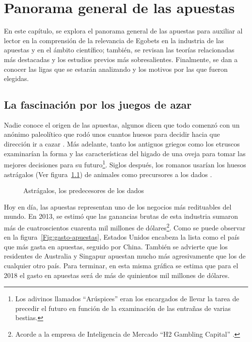 \graphicspath{{/Users/brunomedina/Dropbox/Tesis-Egobets/egobets-notas/resources/marco/}}
\chapter{Panorama general de las apuestas}


En este capítulo, se explora el panorama general de las apuestas para auxiliar al lector en la comprensión de la relevancia de Egobets en la industria de las apuestas y en el ámbito científico; también, se revisan las teorías relacionadas más destacadas y los estudios previos más sobresalientes. Finalmente, se dan a conocer las ligas que se estarán analizando y los motivos por las que fueron elegidas.

 \section{La fascinación por los juegos de azar}

Nadie conoce el origen de las apuestas, algunos dicen que todo comenzó con un anónimo paleolítico que rodó unos cuantos huesos para decidir hacia que dirección ir a cazar \cite{schwartz2013roll}. Más adelante, tanto los antiguos griegos como los etruscos examinarían la forma y las características del higado de una oveja para tomar las mejores decisiones para su futuro\footnote{Los adivinos llamados ``Arúspices'' eran los encargados de llevar la tarea de precedir el futuro en función de la examinación de las entrañas de varias bestias.}. Siglos después, los romanos usarían los huesos astrágalos (Ver figura~\ref{Fig:huesos}) de animales como precursores a los dados \cite{schwartz2013roll}.

\begin{figure}[!htb]\centering
   \begin {minipage}{0.85\textwidth}
     \caption{Astrágalos, los predecesores de los dados}\label{Fig:huesos}
   \end{minipage}
\end{figure}

Hoy en día, las apuestas representan uno de los negocios más redituables del mundo. En 2013, se estimó que las ganancias brutas de esta industria sumaron más de cuatroscientos cuarenta mil millones de dólares\footnote{Acorde a la empresa de Inteligencia de Mercado ``H2 Gambling Capital'' \cite{economistHouseWins}.}. Como se puede observar en la figura~\ref{Fig:gasto-apuestas}, Estados Unidos encabeza la lista como el país que más gasta en apuestas, seguido por China. También se advierte que los residentes de Australia y Singapur apuestan mucho más agresivamente que los de cualquier otro país. Para terminar, en esta misma gráfica se estima que para el 2018 el gasto en apuestas será de más de quinientos mil millones de dólares.


